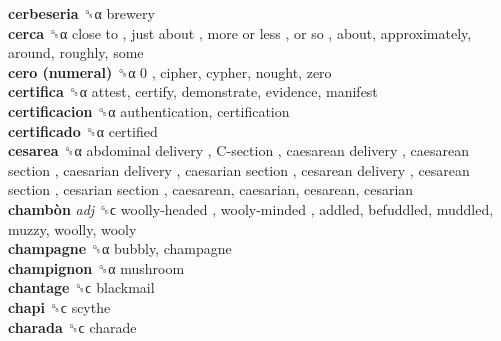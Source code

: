 \textbf{cerbeseria} ␝α  brewery  \\
\textbf{cerca} ␝α   close to ,  just about ,  more or less ,  or so , about, approximately, around, roughly, some  \\
\textbf{cero (numeral)} ␝α   0 , cipher, cypher, nought, zero  \\
\textbf{certifica} ␝α  attest, certify, demonstrate, evidence, manifest  \\
\textbf{certificacion} ␝α  authentication, certification  \\
\textbf{certificado} ␝α  certified  \\
\textbf{cesarea} ␝α   abdominal delivery ,  C-section ,  caesarean delivery ,  caesarean section ,  caesarian delivery ,  caesarian section ,  cesarean delivery ,  cesarean section ,  cesarian section , caesarean, caesarian, cesarean, cesarian  \\
\textbf{chambòn} \emph{adj}  ␝ϲ   woolly-headed ,  wooly-minded , addled, befuddled, muddled, muzzy, woolly, wooly  \\
\textbf{champagne} ␝α  bubbly, champagne  \\
\textbf{champignon} ␝α  mushroom  \\
\textbf{chantage} ␝ϲ  blackmail  \\
\textbf{chapi} ␝ϲ  scythe  \\
\textbf{charada} ␝ϲ  charade  \\
